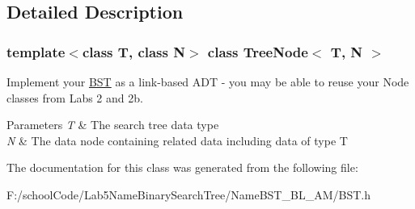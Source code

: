 \subsection{Detailed Description}
\subsubsection*{template$<$class T, class N$>$\newline
class Tree\+Node$<$ T, N $>$}

Implement your \hyperlink{class_b_s_t}{B\+ST} as a link-\/based A\+DT -\/ you may be able to reuse your Node classes from Labs 2 and 2b. 
\begin{DoxyParams}{Parameters}
{\em T} & The search tree data type \\
\hline
{\em N} & The data node containing related data including data of type T \\
\hline
\end{DoxyParams}


The documentation for this class was generated from the following file\+:\begin{DoxyCompactItemize}
\item 
F\+:/school\+Code/\+Lab5\+Name\+Binary\+Search\+Tree/\+Name\+B\+S\+T\+\_\+\+B\+L\+\_\+\+A\+M/B\+S\+T.\+h\end{DoxyCompactItemize}
